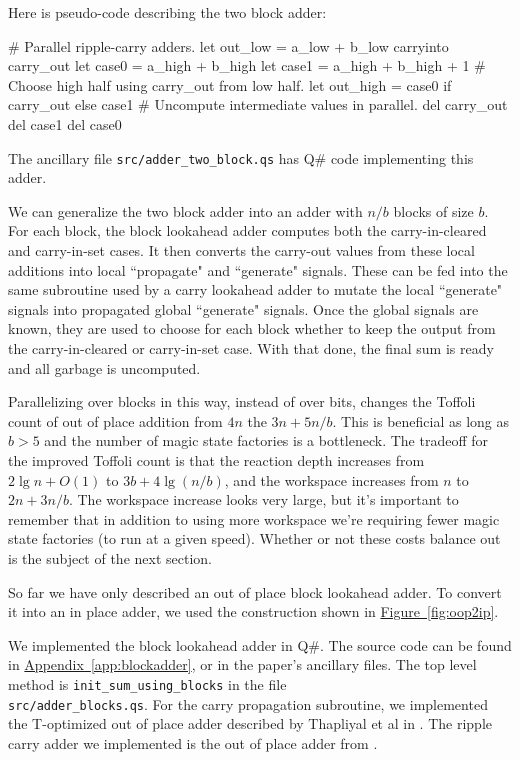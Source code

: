\documentclass[onecolumn,unpublished]{quantumarticle}
\theoremstyle{definition}
\theoremstyle{definition}
\theoremstyle{definition}
\DeclareRobustCommand{\app}[1]{\hyperref[app:#1]{Appendix~\ref*{app:#1}}}
\newcommand{\fig}[1]{\hyperref[fig:#1]{Figure~\ref*{fig:#1}}}
\begin{document}
Here is pseudo-code describing the two block adder:

\begin{python}
    # Parallel ripple-carry adders.
    let out_low = a_low + b_low carryinto carry_out
    let case0 = a_high + b_high
    let case1 = a_high + b_high + 1
    # Choose high half using carry_out from low half.
    let out_high = case0 if carry_out else case1
    # Uncompute intermediate values in parallel.
    del carry_out
    del case1
    del case0
\end{python}

The ancillary file \texttt{src/adder\_two\_block.qs} has Q\# code implementing this adder.

We can generalize the two block adder into an adder with $n/b$ blocks of size $b$.
For each block, the block lookahead adder computes both the carry-in-cleared and carry-in-set cases.
It then converts the carry-out values from these local additions into local ``propagate" and ``generate" signals.
These can be fed into the same subroutine used by a carry lookahead adder to mutate the local ``generate" signals into propagated global ``generate" signals.
Once the global signals are known, they are used to choose for each block whether to keep the output from the carry-in-cleared or carry-in-set case.
With that done, the final sum is ready and all garbage is uncomputed.

Parallelizing over blocks in this way, instead of over bits, changes the Toffoli count of out of place addition from $4n$ the $3n + 5n/b$.
This is beneficial as long as $b > 5$ and the number of magic state factories is a bottleneck.
The tradeoff for the improved Toffoli count is that the reaction depth increases from $2 \lg n + O(1)$ to $3 b + 4 \lg(n/b)$, and the workspace increases from $n$ to $2n + 3n/b$.
The workspace increase looks very large, but it's important to remember that in addition to using more workspace we're requiring fewer magic state factories (to run at a given speed).
Whether or not these costs balance out is the subject of the next section.

So far we have only described an out of place block lookahead adder.
To convert it into an in place adder, we used the construction shown in \fig{oop2ip}.

We implemented the block lookahead adder in Q\#.
The source code can be found in \app{blockadder}, or in the paper's ancillary files.
The top level method is \texttt{init\_sum\_using\_blocks} in the file \\\texttt{src/adder\_blocks.qs}.
For the carry propagation subroutine, we implemented the T-optimized out of place adder described by Thapliyal et al in \cite{thapliyal2020lookahead}.
The ripple carry adder we implemented is the out of place adder from \cite{gidney2018halving}.
\end{document}
